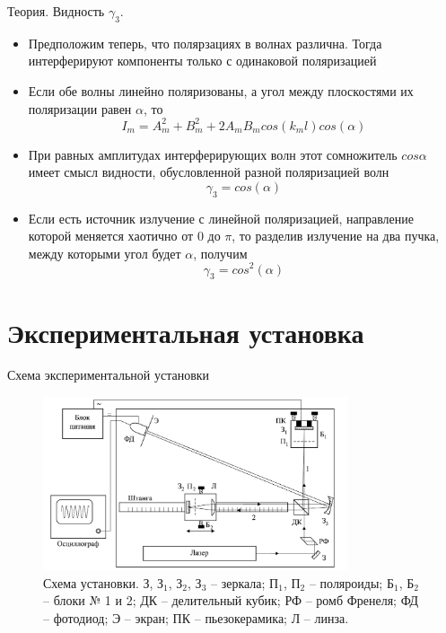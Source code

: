 \documentclass[11pt]{beamer} %
\begin{document}
    \begin{frame}{Теория. Видность $\gamma_3$.}
        \begin{itemize}
            \item Предположим теперь, что полярзациях в волнах различна. Тогда интерферируют компоненты только с одинаковой поляризацией
            \item Если обе волны линейно поляризованы, а угол между плоскостями их поляризации равен $\alpha$, то
            $$
                 I_m = A_m^2 + B_m^2 + 2A_mB_m cos(k_m l)cos(\alpha)
            $$
            \item При равных амплитудах интерферирующих волн этот сомножитель $cos\alpha$ имеет смысл видности, обусловленной разной поляризацией волн
            $$
                \gamma_3 = cos(\alpha)
            $$

            \item Если есть источник излучение с линейной поляризацией, направление которой меняется хаотично от $0$ до $\pi$, то разделив излучение на два пучка, между которыми угол будет $\alpha$, получим 
            \begin{equation}
                \gamma_3 = cos^2(\alpha)
            \end{equation}
        \end{itemize}
        
    \end{frame}
    
    \section{Экспериментальная установка}

    \begin{frame}{Схема экспериментальной установки}
    \small
    \begin{figure}[H]
        \centering
        \includegraphics[width = 0.8\textwidth]{images/installation.png}
        \caption{Схема установки. З, $\text{З}_1$, $\text{З}_2$, $\text{З}_3$ -- зеркала; $\text{П}_1$, $\text{П}_2$ -- поляроиды; $\text{Б}_1$, $\text{Б}_2$ -- блоки № 1 и 2; ДК -- делительный кубик; РФ -- ромб Френеля; ФД -- фотодиод; Э -- экран; ПК -- пьезокерамика; Л -- линза.}
        \label{fig:installation_1}
    \end{figure}
    \end{frame}
\end{document}
